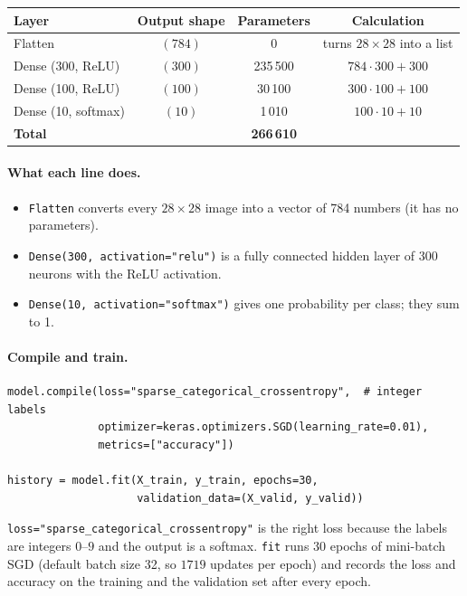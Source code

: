 \begin{center}
\begin{tabular}{@{}lccc@{}}
\toprule
\textbf{Layer} & \textbf{Output shape} & \textbf{Parameters} & \textbf{Calculation}\\
\midrule
Flatten & $(784)$ & 0 & turns $28\times28$ into a list\\
Dense (300, ReLU) & $(300)$ & 235\,500 & $784\cdot300+300$\\
Dense (100, ReLU) & $(100)$ & 30\,100 & $300\cdot100+100$\\
Dense (10, softmax) & $(10)$ & 1\,010 & $100\cdot10+10$\\
\midrule
\textbf{Total} & & \textbf{266\,610} & \\
\bottomrule
\end{tabular}
\end{center}

\paragraph{What each line does.}
\begin{itemize}
  \item \texttt{Flatten} converts every $28\times28$ image into a vector of 784 numbers (it has no parameters).
  \item \texttt{Dense(300, activation="relu")} is a fully connected hidden layer of 300 neurons with the ReLU activation.
  \item \texttt{Dense(10, activation="softmax")} gives one probability per class; they sum to 1.
\end{itemize}

\paragraph{Compile and train.}
\begin{lstlisting}
model.compile(loss="sparse_categorical_crossentropy",  # integer labels
              optimizer=keras.optimizers.SGD(learning_rate=0.01),
              metrics=["accuracy"])

history = model.fit(X_train, y_train, epochs=30,
                    validation_data=(X_valid, y_valid))
\end{lstlisting}
\texttt{loss="sparse\_categorical\_crossentropy"} is the right loss because the labels are integers $0$--$9$ and the output is a softmax. \texttt{fit} runs 30 epochs of mini-batch SGD (default batch size 32, so $1719$ updates per epoch) and records the loss and accuracy on the training and the validation set after every epoch.

